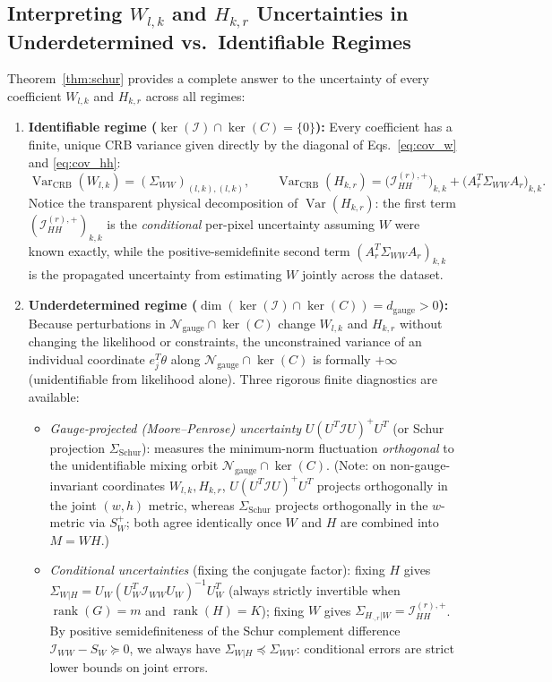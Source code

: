 \documentclass[11pt,a4paper]{article}
\theoremstyle{plain}
\theoremstyle{definition}
\theoremstyle{remark}
\newcommand{\cN}{\mathcal{N}}
\newcommand{\cI}{\mathcal{I}}
\newcommand{\rank}{\operatorname{rank}}
\newcommand{\Var}{\operatorname{Var}}
\newcommand{\pinv}{^{+}}
\begin{document}
\subsection{Interpreting \texorpdfstring{$W_{l,k}$}{W\_\{l,k\}} and \texorpdfstring{$H_{k,r}$}{H\_\{k,r\}} Uncertainties in Underdetermined vs.\ Identifiable Regimes}
Theorem~\ref{thm:schur} provides a complete answer to the uncertainty of every coefficient $W_{l,k}$ and $H_{k,r}$ across all regimes:
\begin{enumerate}[leftmargin=1.5em]
    \item \textbf{Identifiable regime ($\ker(\cI)\cap\ker(C)=\{0\}$):} Every coefficient has a finite, unique CRB variance given directly by the diagonal of Eqs.~\eqref{eq:cov_w} and \eqref{eq:cov_hh}:
    \begin{equation}
    \Var_{\text{CRB}}(W_{l,k}) = (\Sigma_{WW})_{(l,k),(l,k)}, \qquad
    \Var_{\text{CRB}}(H_{k,r}) = \big(\cI_{HH}^{(r),+}\big)_{k,k} + \big(A_r^T \Sigma_{WW} A_r\big)_{k,k}.
    \end{equation}
    Notice the transparent physical decomposition of $\Var(H_{k,r})$: the first term $(\cI_{HH}^{(r),+})_{k,k}$ is the \emph{conditional} per-pixel uncertainty assuming $W$ were known exactly, while the positive-semidefinite second term $(A_r^T \Sigma_{WW} A_r)_{k,k}$ is the propagated uncertainty from estimating $W$ jointly across the dataset.
    \item \textbf{Underdetermined regime ($\dim(\ker(\cI)\cap\ker(C)) = d_{\text{gauge}} > 0$):} Because perturbations in $\cN_{\text{gauge}}\cap\ker(C)$ change $W_{l,k}$ and $H_{k,r}$ without changing the likelihood or constraints, the unconstrained variance of an individual coordinate $e_j^T \theta$ along $\cN_{\text{gauge}}\cap\ker(C)$ is formally $+\infty$ (unidentifiable from likelihood alone). Three rigorous finite diagnostics are available:
    \begin{itemize}[leftmargin=1.2em]
        \item \emph{Gauge-projected (Moore--Penrose) uncertainty} $U(U^T \cI U)\pinv U^T$ (or Schur projection $\Sigma_{\text{Schur}}$): measures the minimum-norm fluctuation \emph{orthogonal} to the unidentifiable mixing orbit $\cN_{\text{gauge}} \cap \ker(C)$. (Note: on non-gauge-invariant coordinates $W_{l,k}, H_{k,r}$, $U(U^T\cI U)\pinv U^T$ projects orthogonally in the joint $(w,h)$ metric, whereas $\Sigma_{\text{Schur}}$ projects orthogonally in the $w$-metric via $S_W\pinv$; both agree identically once $W$ and $H$ are combined into $M = WH$.)
        \item \emph{Conditional uncertainties} (fixing the conjugate factor): fixing $H$ gives $\Sigma_{W|H} = U_W(U_W^T \cI_{WW} U_W)^{-1} U_W^T$ (always strictly invertible when $\rank(G)=m$ and $\rank(H)=K$); fixing $W$ gives $\Sigma_{H_{\cdot,r}|W} = \cI_{HH}^{(r),+}$. By positive semidefiniteness of the Schur complement difference $\cI_{WW} - S_W \succeq 0$, we always have $\Sigma_{W|H} \preceq \Sigma_{WW}$: conditional errors are strict lower bounds on joint errors.

\end{itemize}
\end{enumerate}
\end{document}
